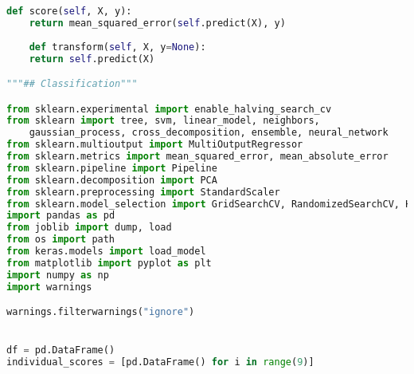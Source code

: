 \begin{lstlisting}[label=python-listing,caption={Kod źródłowy},language=python]
    def score(self, X, y):
    return mean_squared_error(self.predict(X), y)
    
    def transform(self, X, y=None):
    return self.predict(X)

"""## Classification"""

from sklearn.experimental import enable_halving_search_cv 
from sklearn import tree, svm, linear_model, neighbors, 
    gaussian_process, cross_decomposition, ensemble, neural_network
from sklearn.multioutput import MultiOutputRegressor
from sklearn.metrics import mean_squared_error, mean_absolute_error
from sklearn.pipeline import Pipeline
from sklearn.decomposition import PCA
from sklearn.preprocessing import StandardScaler
from sklearn.model_selection import GridSearchCV, RandomizedSearchCV, HalvingGridSearchCV
import pandas as pd
from joblib import dump, load
from os import path
from keras.models import load_model
from matplotlib import pyplot as plt
import numpy as np
import warnings

warnings.filterwarnings("ignore")


df = pd.DataFrame()
individual_scores = [pd.DataFrame() for i in range(9)]



\end{lstlisting}
